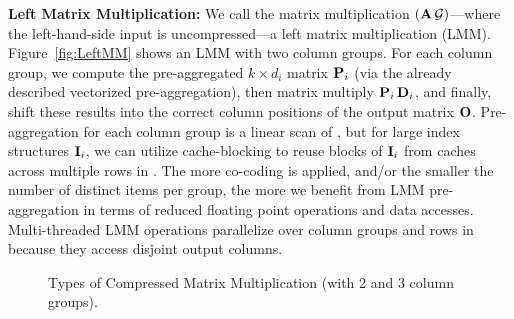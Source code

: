 




\textbf{Left Matrix Multiplication:} We call the matrix multiplication $(\mathbf{A}\,\mathcal{G})$---where the left-hand-side input  is uncompressed---a left matrix multiplication (LMM). Figure~\ref{fig:LeftMM} shows an LMM with two column groups.
For each column group, we compute the pre-aggregated $k \times d_i$ matrix $\mathbf{P}_i$ (via the already described vectorized pre-aggregation),
then matrix multiply $\mathbf{P}_i\,\mathbf{D}_i$, and finally, shift these results into the correct column positions of the output matrix $\mathbf{O}$.
Pre-aggregation for each column group is a linear scan of , but for large index structures $\mathbf{I}_i$, we can utilize cache-blocking
to reuse blocks of $\mathbf{I}_i$ from caches across multiple rows in . The more co-coding is applied, and/or the smaller the number of distinct items per group, the more we benefit from LMM pre-aggregation in terms of reduced floating point operations and data accesses. Multi-threaded LMM operations parallelize over column groups and rows in  because they access disjoint output columns.

\begin{figure}[!t]
	\centering
	\vspace{-0.35cm}
	\caption{\label{fig:ops}Types of Compressed Matrix Multiplication (with 2 and 3 column groups).}
	\Description{}
\end{figure}

